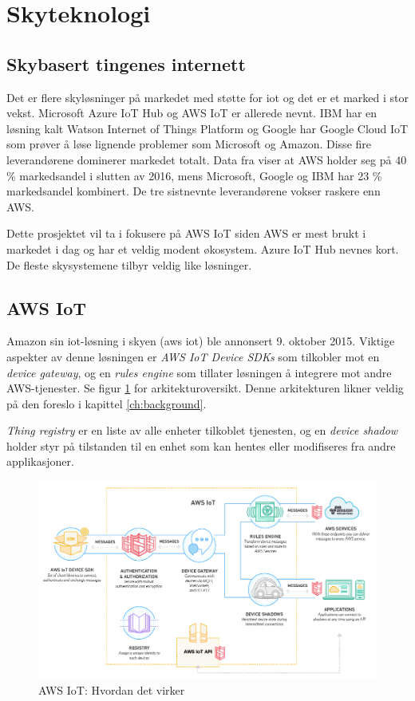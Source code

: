 \section{Skyteknologi}
\blindtext

\subsection{Skybasert tingenes internett}

Det er flere skyløsninger på markedet med støtte for \gls{iot} og det er et marked i stor vekst.
Microsoft Azure IoT Hub og AWS IoT er allerede nevnt. IBM har en løsning kalt Watson Internet of Things Platform og
Google har Google Cloud IoT
som prøver å løse lignende problemer som Microsoft og Amazon.
Disse fire leverandørene dominerer markedet totalt. Data fra \citet{srg_cloud}
viser at AWS holder seg på 40 \% markedsandel i slutten av 2016, mens Microsoft,
Google og IBM har 23 \% markedsandel kombinert. De tre sistnevnte leverandørene vokser raskere enn AWS.

Dette prosjektet vil ta i fokusere på AWS IoT siden AWS er mest brukt i markedet i dag
og har et veldig modent økosystem. Azure IoT Hub nevnes kort. De fleste skysystemene tilbyr veldig like
løsninger.

\subsection{AWS IoT}
\label{sec:aws_iot}
Amazon sin \gls{iot}-løsning i skyen (\gls{aws} \gls{iot}) ble annonsert 9. oktober 2015.
Viktige aspekter av denne løsningen er \textit{AWS IoT Device SDKs} som tilkobler mot 
en \textit{device gateway}, og en \textit{rules engine} som tillater løsningen å integrere
mot andre AWS-tjenester. Se figur \ref{fig:awsiot_how} for arkitekturoversikt.
Denne arkitekturen likner veldig på den \citet{iot_harvard_smart} foreslo i kapittel \ref{ch:background}.

\textit{Thing registry} er en liste av alle enheter tilkoblet tjenesten, og en \textit{device shadow}
holder styr på tilstanden til en enhet som kan hentes eller modifiseres fra andre applikasjoner.

\begin{figure}
\includegraphics[width=1.0\textwidth,center]{fig/awsiot_how}
\caption{AWS IoT: Hvordan det virker \citep{aws_works}}
\label{fig:awsiot_how}
\end{figure}


